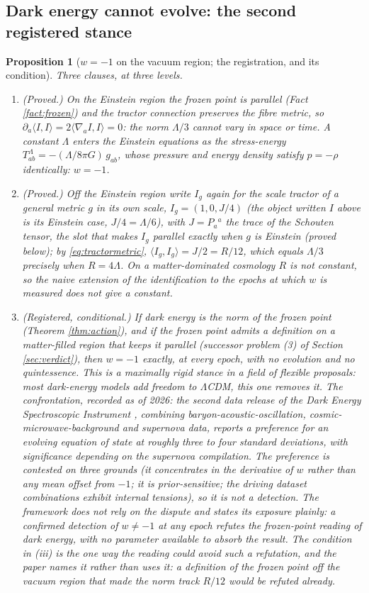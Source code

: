 \documentclass[11pt]{article}
\newtheorem{proposition}[theorem]{Proposition}
\theoremstyle{definition}
\newcommand{\ip}[2]{\langle #1, #2\rangle}
\begin{document}
\subsection{Dark energy cannot evolve: the second registered stance}\label{subsec:w}

\begin{proposition}[$w = -1$ on the vacuum region; the registration, and its condition]\label{prop:w}
Three clauses, at three levels.
\begin{enumerate}
\item[(i)] \emph{(Proved.)} On the Einstein region the frozen point is parallel (Fact \ref{fact:frozen}) and the tractor connection preserves the fibre metric, so $\partial_a\ip{I}{I} = 2\ip{\nabla_a I}{I} = 0$: the norm $\Lambda/3$ cannot vary in space or time. A constant $\Lambda$ enters the Einstein equations as the stress-energy $T^{\Lambda}_{ab} = -(\Lambda/8\pi G)\,g_{ab}$, whose pressure and energy density satisfy $p = -\rho$ identically: $w = -1$.
\item[(ii)] \emph{(Proved.)} Off the Einstein region write $I_g$ again for the scale tractor of a general metric $g$ in its own scale, $I_g = (1, 0, J/4)$ (the object written $I$ above is its Einstein case, $J/4 = \Lambda/6$), with $J = P_a{}^a$ the trace of the Schouten tensor, the slot that makes $I_g$ parallel exactly when $g$ is Einstein (proved below); by \eqref{eq:tractormetric}, $\ip{I_g}{I_g} = J/2 = R/12$, which equals $\Lambda/3$ precisely when $R = 4\Lambda$. On a matter-dominated cosmology $R$ is not constant, so the naive extension of the identification to the epochs at which $w$ is measured does not give a constant.
\item[(iii)] \emph{(Registered, conditional.)} If dark energy is the norm of the frozen point (Theorem \ref{thm:action}), and if the frozen point admits a definition on a matter-filled region that keeps it parallel (successor problem (3) of Section \ref{sec:verdict}), then $w = -1$ exactly, at every epoch, with no evolution and no quintessence. This is a maximally rigid stance in a field of flexible proposals: most dark-energy models add freedom to $\Lambda$CDM, this one removes it. \emph{The confrontation, recorded as of 2026:} the second data release of the Dark Energy Spectroscopic Instrument \cite{DESI2025}, combining baryon-acoustic-oscillation, cosmic-microwave-background and supernova data, reports a preference for an evolving equation of state at roughly three to four standard deviations, with significance depending on the supernova compilation. The preference is contested on three grounds (it concentrates in the derivative of $w$ rather than any mean offset from $-1$; it is prior-sensitive; the driving dataset combinations exhibit internal tensions), so it is not a detection. The framework does not rely on the dispute and states its exposure plainly: a confirmed detection of $w \neq -1$ at any epoch refutes the frozen-point reading of dark energy, with no parameter available to absorb the result. The condition in (iii) is the one way the reading could avoid such a refutation, and the paper names it rather than uses it: a definition of the frozen point off the vacuum region that made the norm track $R/12$ would be refuted already.

\end{enumerate}
\end{proposition}
\end{document}
